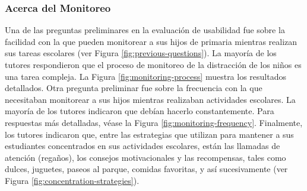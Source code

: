 \documentclass[a4paper,fleqn]{cas-sc}
\begin{document}
	\subsubsection{Acerca del Monitoreo}
	Una de las preguntas preliminares en la evaluación de usabilidad fue sobre la facilidad con la que pueden monitorear a sus hijos de primaria mientras realizan sus tareas escolares (ver Figura \ref{fig:previous-questions}). La mayoría de los tutores respondieron que el proceso de monitoreo de la distracción de los niños es una tarea compleja. La Figura \ref{fig:monitoring-process} muestra los resultados detallados. Otra pregunta preliminar fue sobre la frecuencia con la que necesitaban monitorear a sus hijos mientras realizaban actividades escolares. La mayoría de los tutores indicaron que debían hacerlo constantemente. Para respuestas más detalladas, véase la Figura \ref{fig:monitoring-frequency}. Finalmente, los tutores indicaron que, entre las estrategias que utilizan para mantener a sus estudiantes concentrados en sus actividades escolares, están las llamadas de atención (regaños), los consejos motivacionales y las recompensas, tales como dulces, juguetes, paseos al parque, comidas favoritas, y así sucesivamente (ver Figura \ref{fig:concentration-strategies}).
	
\end{document}
